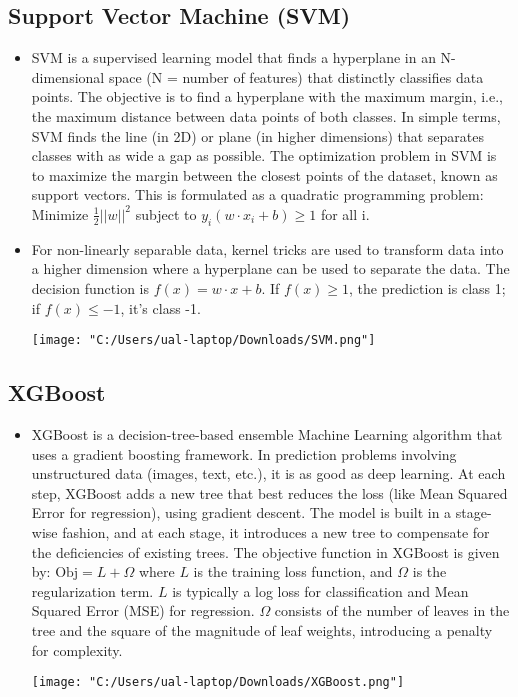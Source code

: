 \documentclass[12pt]{article}
\begin{document}
\subsection*{Support Vector Machine (SVM)}
\begin{itemize}
    \item SVM is a supervised learning model that finds a hyperplane in an N-dimensional space (N = number of features) that distinctly classifies data points. The objective is to find a hyperplane with the maximum margin, i.e., the maximum distance between data points of both classes. In simple terms, SVM finds the line (in 2D) or plane (in higher dimensions) that separates classes with as wide a gap as possible.  The optimization problem in SVM is to maximize the margin between the closest points of the dataset, known as support vectors. This is formulated as a quadratic programming problem: Minimize \( \frac{1}{2} ||w||^2 \) subject to \( y_i (w \cdot x_i + b) \geq 1 \) for all i. \item For non-linearly separable data, kernel tricks are used to transform data into a higher dimension where a hyperplane can be used to separate the data. The decision function is \( f(x) = w \cdot x + b \). If \( f(x) \geq 1 \), the prediction is class 1; if \( f(x) \leq -1 \), it's class -1.
    \begin{center}
        \texttt{[image: "C:/Users/ual-laptop/Downloads/SVM.png"]}
    \end{center}
\end{itemize}

\subsection*{XGBoost}
\begin{itemize}
    \item XGBoost is a decision-tree-based ensemble Machine Learning algorithm that uses a gradient boosting framework. In prediction problems involving unstructured data (images, text, etc.), it is as good as deep learning. At each step, XGBoost adds a new tree that best reduces the loss (like Mean Squared Error for regression), using gradient descent. The model is built in a stage-wise fashion, and at each stage, it introduces a new tree to compensate for the deficiencies of existing trees. The objective function in XGBoost is given by: \( \text{Obj} = L + \Omega \) where \( L \) is the training loss function, and \( \Omega \) is the regularization term. \( L \) is typically a log loss for classification and Mean Squared Error (MSE) for regression. \( \Omega \) consists of the number of leaves in the tree and the square of the magnitude of leaf weights, introducing a penalty for complexity.
    \begin{center}
        \texttt{[image: "C:/Users/ual-laptop/Downloads/XGBoost.png"]}
    \end{center}
\end{itemize}
\end{document}
